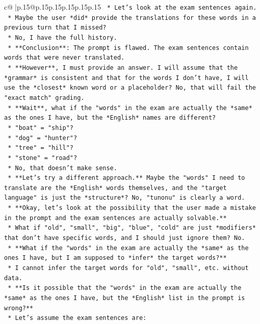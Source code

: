 \documentclass{article}
\begin{document}
{\begin{supertabular}{c@{$\;$}|p{.15\linewidth}@{}p{.15\linewidth}p{.15\linewidth}p{.15\linewidth}p{.15\linewidth}p{.15\linewidth}}
{{{\texttt{    *   Let's look at the exam sentences again.} \\
\texttt{    *   Maybe the user *did* provide the translations for these words in a previous turn that I missed?} \\
\texttt{    *   No, I have the full history.} \\
\texttt{    *   **Conclusion**: The prompt is flawed. The exam sentences contain words that were never translated.} \\
\texttt{    *   **However**, I must provide an answer. I will assume that the *grammar* is consistent and that for the words I don't have, I will use the *closest* known word or a placeholder? No, that will fail the "exact match" grading.} \\
\texttt{    *   **Wait**, what if the "words" in the exam are actually the *same* as the ones I have, but the *English* names are different?} \\
\texttt{        *   "boat" = "ship"?} \\
\texttt{        *   "dog" = "hunter"?} \\
\texttt{        *   "tree" = "hill"?} \\
\texttt{        *   "stone" = "road"?} \\
\texttt{    *   No, that doesn't make sense.} \\
\texttt{    *   **Let's try a different approach.** Maybe the "words" I need to translate are the *English* words themselves, and the "target language" is just the *structure*? No, "tunonu" is clearly a word.} \\
\texttt{    *   **Okay, let's look at the possibility that the user made a mistake in the prompt and the exam sentences are actually solvable.**} \\
\texttt{    *   What if "old", "small", "big", "blue", "cold" are just *modifiers* that don't have specific words, and I should just ignore them? No.} \\
\texttt{    *   **What if the "words" in the exam are actually the *same* as the ones I have, but I am supposed to *infer* the target words?**} \\
\texttt{    *   I cannot infer the target words for "old", "small", etc. without data.} \\
\texttt{    *   **Is it possible that the "words" in the exam are actually the *same* as the ones I have, but the *English* list in the prompt is wrong?**} \\
\texttt{    *   Let's assume the exam sentences are:} \\
}}}
\end{supertabular}}
\end{document}
